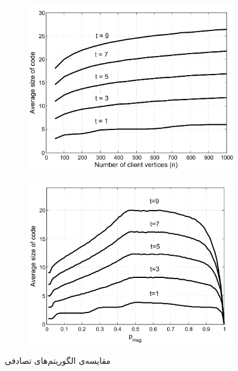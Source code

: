 \begin{figure}
\begin{subfigure}[b]{0.45\textwidth}
        \caption{}
        \label{fig:pliable2015b}
    \end{subfigure}
    \\
    \begin{subfigure}[b]{0.45\textwidth}
        \centering
        \includegraphics[width=\textwidth]{figs/ch3/pliable2015_c}
        \caption{}
        \label{fig:pliable2015c}
    \end{subfigure}
    \hfill
    \begin{subfigure}[b]{0.45\textwidth}
        \centering
        \includegraphics[width=\textwidth]{figs/ch3/pliable2015_d}
        \caption{}
        \label{fig:pliable2015d}
    \end{subfigure}
    \caption[
        مقایسه‌ی الگوریتم‌های تصادفی
    ]{
        مقایسه‌ی الگوریتم‌های تصادفی
        \cite{pliable2015paper}
    }
    \label{fig:pliable2015}
\end{figure}

